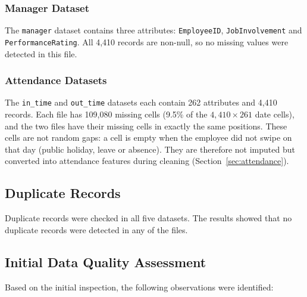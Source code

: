 \documentclass[12pt,a4paper]{article}
\begin{document}
\subsubsection{Manager Dataset}

The \texttt{manager} dataset contains three attributes:
\texttt{EmployeeID}, \texttt{JobInvolvement} and
\texttt{PerformanceRating}. All 4,410 records are non-null,
so no missing values were detected in this file.


\subsubsection{Attendance Datasets}

The \texttt{in\_time} and \texttt{out\_time} datasets
each contain 262 attributes and 4,410 records. Each file has
109,080 missing cells (9.5\% of the $4{,}410 \times 261$ date cells), and
the two files have their missing cells in exactly the same positions.
These cells are not random gaps: a cell is empty when the employee did
not swipe on that day (public holiday, leave or absence). They are
therefore not imputed but converted into attendance features during
cleaning (Section~\ref{sec:attendance}).

\subsection{Duplicate Records}

Duplicate records were checked in all five datasets.
The results showed that no duplicate records were detected
in any of the files.

\subsection{Initial Data Quality Assessment}

Based on the initial inspection, the following observations
were identified:
\end{document}
